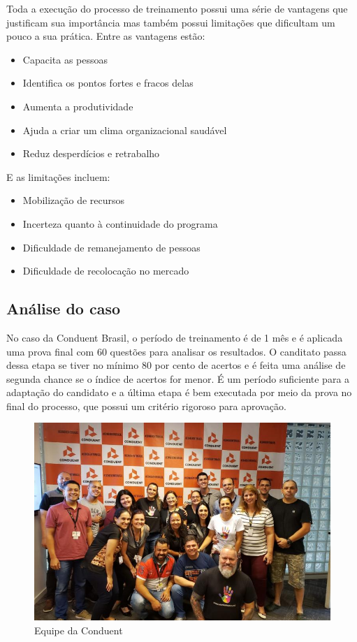 \documentclass[12pt]{article}
\begin{document}
Toda a execução do processo de treinamento possui uma série de vantagens que justificam sua importância mas também possui limitações que dificultam um pouco a sua prática. 
Entre as vantagens estão:

\begin{itemize}

\item Capacita as pessoas
\item Identifica os pontos fortes e fracos delas
\item Aumenta a produtividade
\item Ajuda a criar um clima organizacional saudável
\item Reduz desperdícios e retrabalho

\end{itemize}

E as limitações incluem:

\begin{itemize}

\item Mobilização de recursos
\item Incerteza quanto à continuidade do programa
\item Dificuldade de remanejamento de pessoas
\item Dificuldade de recolocação no mercado

\end{itemize}

\subsection{Análise do caso}

No caso da Conduent Brasil, o período de treinamento é de 1 mês e é aplicada uma prova final com 60 questões para analisar os resultados. O canditato passa dessa etapa se tiver no mínimo 80 por cento de acertos e é feita uma análise de segunda chance se o índice de acertos for menor. É um período suficiente para a adaptação do candidato e a última etapa é bem executada por meio da prova no final do processo, que possui um critério rigoroso para aprovação.

\begin{figure}[h]
	\centering
	\includegraphics[width=1.0\textwidth]{build/images/mama}
	\caption{Equipe da Conduent}
\end{figure}
\newpage
\end{document}
